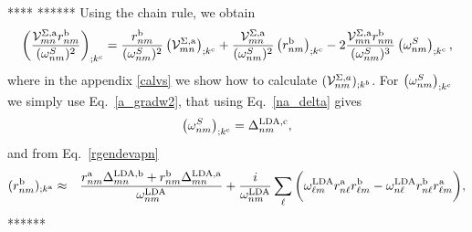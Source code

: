 \documentclass[floatfix,prb,aps,superscriptaddress,11pt,preprint]{revtex4}
\begin{document}
****
******
Using the chain rule, we obtain
\begin{eqnarray}\label{chrn1}
\left(
\frac{{\mathbf{\cal V}}^{\Sigma,\mathrm{a}}_{mn}r^{\mathrm{b}}_{nm}}{(\omega^S_{nm})^2}
\right)_{;k^{\mathrm{c}}}
=
\frac{r^{\mathrm{b}}_{nm}}{(\omega^S_{nm})^2}
\left(
{\mathbf{\cal V}} ^{\Sigma,\mathrm{a}}_{mn}
\right)_{;k^{\mathrm{c}}}
+
\frac{{\mathbf{\cal V}}^{\Sigma,\mathrm{a}}_{mn}}{(\omega^S_{nm})^2}
\left(
r^{\mathrm{b}}_{nm}
\right)_{;k^{\mathrm{c}}}
-
2\frac{{\mathbf{\cal V}}^{\Sigma,\mathrm{a}}_{mn}r^{\mathrm{b}}_{nm}}{(\omega^S_{nm})^3}
\left(
\omega^S_{nm}
\right)_{;k^{\mathrm{c}}}
,
\end{eqnarray}
where in the appendix \ref{calvs} 
we show how to calculate $({\mathbf{\cal V}}^{\Sigma,a}_{nm})_{;k^b}$.
For 
$\left(\omega^S_{nm}\right)_{;k^{\mathrm{c}}}$
 we simply use
Eq.~\eqref{a_gradw2}, that using Eq.~\eqref{na_delta} gives
\begin{equation}\label{eli.1}
\left(\omega^S_{nm}\right)_{;k^{\mathrm{c}}}
=\Delta^{\mathrm{LDA},\mathrm{c}}_{nm}
,
\end{equation}
and from Eq.~\eqref{rgendevapn}
\begin{eqnarray}\label{eli.2}
(r^{\mathrm{b}}_{nm})_{;k^{\mathrm{a}}}
&\approx&
\frac{
r^{\mathrm{a}}_{nm}
\Delta^{\mathrm{LDA},\mathrm{b}}_{mn}
+r^{\mathrm{b}}_{nm}
\Delta^{\mathrm{LDA},\mathrm{a}}_{mn}
}
{\omega^{\mathrm{LDA}}_{nm}}
+
\frac{i}{\omega^{\mathrm{LDA}}_{nm}}
\sum_{\ell}
\bigg(
\omega^{\mathrm{LDA}}_{\ell m}
r^{\mathrm{a}}_{n\ell}
r^{\mathrm{b}}_{\ell m}
-
\omega^{\mathrm{LDA}}_{n\ell}
r^{\mathrm{b}}_{n\ell}
r^{\mathrm{a}}_{\ell m}
\bigg)
,
\end{eqnarray}
******
\end{document}
